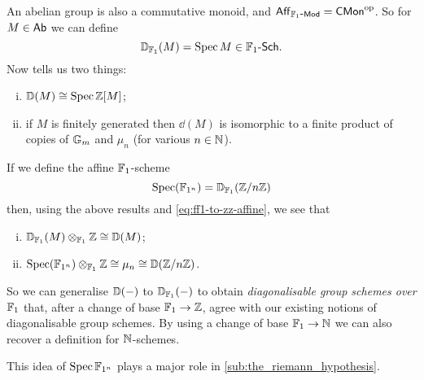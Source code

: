         \bigskip

        An abelian group is also a commutative monoid, and $\mathsf{Aff}_{{{\mathbb{F}_1}\hbox{-}\mathsf{Mod}}}={\mathsf{CMon}}^{\mathrm{op}}$.
        So for $M\in\mathsf{Ab}$ we can define
        \begin{equation*}
            \mathbb{D}_{\mathbb{F}_1}(M) = \operatorname{Spec} M\in{\mathbb{F}_1}\hbox{-}\mathsf{Sch}.
        \end{equation*}
        Now \cite[Proposition~3.3,~\S XIV.3,~p.217]{Milne:2012wc} tells us two things:
        \begin{enumerate}[(i)]
            \item $\mathbb{D}(M)\cong\operatorname{Spec}\mathbb{Z}[M]$;
            \item if $M$ is finitely generated then $\dd(M)$ is isomorphic to a finite product of copies of $\mathbb{G}_m$ and $\mu_n$ (for various $n\in\mathbb{N}$).
        \end{enumerate}
        If we define the affine $\mathbb{F}_1$-scheme
        \begin{equation*}
            \operatorname{Spec}(\mathbb{F}_{1^n}) = \mathbb{D}_{\mathbb{F}_1}(\mathbb{Z}/n\mathbb{Z})
        \end{equation*}
        then, using the above results and \cref{eq:ff1-to-zz-affine}, we see that
        \begin{enumerate}[(i)]
            \item $\mathbb{D}_{\mathbb{F}_1}(M)\otimes_{\mathbb{F}_1}\mathbb{Z} \cong \mathbb{D}(M)$;
            \item $\operatorname{Spec}(\mathbb{F}_{1^n})\otimes_{\mathbb{F}_1}\mathbb{Z} \cong \mu_n \cong \mathbb{D}(\mathbb{Z}/n\mathbb{Z})$.
        \end{enumerate}
        So we can generalise $\mathbb{D}({-})$ to $\mathbb{D}_{\mathbb{F}_1}({-})$ to obtain \emph{diagonalisable group schemes over $\mathbb{F}_1$} that, after a change of base $\mathbb{F}_1\to\mathbb{Z}$, agree with our existing notions of diagonalisable group schemes.
        By using a change of base $\mathbb{F}_1\to\mathbb{N}$ we can also recover a definition for $\mathbb{N}$-schemes.

        This idea of $\operatorname{Spec}\mathbb{F}_{1^n}$ plays a major role in \cref{sub:the_riemann_hypothesis}.
    

